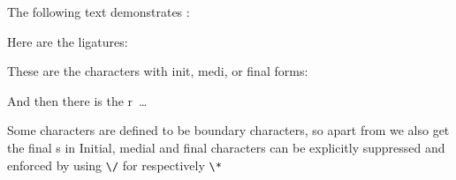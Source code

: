 \documentclass{article}
\begin{document}
\noindent
The following text demonstrates :
\bigskip



\medskip
\noindent
Here are the ligatures:\par
{}

\noindent
These are the characters with init, medi, or final forms:\par
{}

\noindent
And then there is the r~\ldots\par
{}

\noindent
Some characters are defined to be boundary characters, so apart from  we also get the final s in 
Initial, medial and final characters can be explicitly suppressed and enforced by using \verb|\/| for  respectively \verb|\*| 
\end{document}
